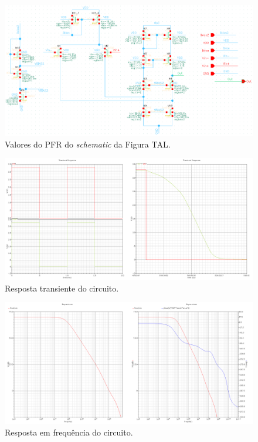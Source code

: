 \documentclass[11pt]{article}
\numberwithin{equation}{section}
\begin{document}
\begin{figure}[H]
	\centering
	\includegraphics[keepaspectratio=true, scale=0.75]{exps/PFR_final}
	\vspace{-0.5em}
	\caption{Valores do PFR do \textit{schematic} da Figura TAL.}
	\vspace{-0.8em}
\end{figure} 

\begin{figure}[H]
	\centering
	\includegraphics[keepaspectratio=true, scale=0.25]{exps/snapshotDc_Slewrate}
	\vspace{-0.5em}
	\caption{Resposta transiente do circuito.}
	\vspace{-0.8em}
\end{figure} 

\begin{figure}[H]
	\centering
	\includegraphics[keepaspectratio=true, scale=0.25]{exps/snapshotAC_Final}
	\vspace{-0.5em}
	\caption{Resposta em frequência do circuito.}
	\vspace{-0.8em}
\end{figure} 
\end{document}
